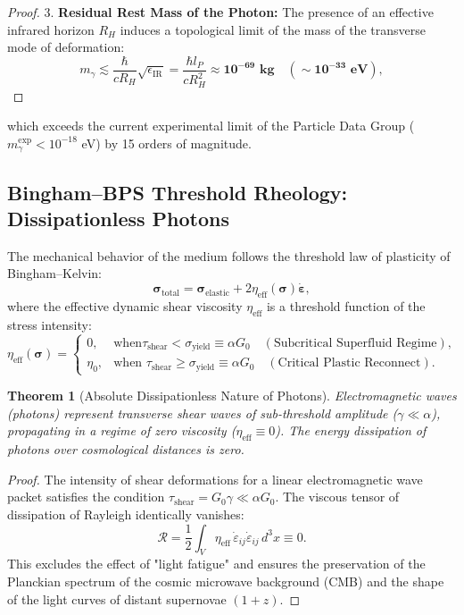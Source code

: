 \documentclass[12pt,a4paper]{article}
\newtheorem{theorem}{Theorem}
\begin{document}
\begin{proof}
	3. \textbf{Residual Rest Mass of the Photon:}
	The presence of an effective infrared horizon $R_H$ induces a topological limit of the mass of the transverse mode of deformation:
	\begin{equation}
	m_\gamma \lesssim \frac{\hbar}{c R_H} \sqrt{\epsilon_{\text{IR}}} = \frac{\hbar l_P}{c R_H^2} \approx \mathbf{10^{-69} \text{ kg}} \quad (\sim \mathbf{10^{-33} \text{ eV}}),
	\end{equation}
\end{proof}
	which exceeds the current experimental limit of the Particle Data Group ($m_\gamma^{\text{exp}} < 10^{-18}$ eV) by 15 orders of magnitude.
	
\subsection{Bingham--BPS Threshold Rheology: Dissipationless Photons}
	The mechanical behavior of the medium follows the threshold law of plasticity of Bingham--Kelvin:
\begin{equation}
\boldsymbol{\sigma}_{\text{total}} = \boldsymbol{\sigma}_{\text{elastic}} + 2 \eta_{\text{eff}}(\boldsymbol{\sigma}) \dot{\boldsymbol{\varepsilon}},
\end{equation}
where the effective dynamic shear viscosity $\eta_{\text{eff}}$ is a threshold function of the stress intensity:
\begin{equation}
\eta_{\text{eff}}(\boldsymbol{\sigma}) = \begin{cases} 
0, & \text{when} \tau_{\text{shear}} < \sigma_{\text{yield}} \equiv \alpha G_0 \quad (\text{Subcritical Superfluid Regime}), \\
\eta_0, & \text{when } \tau_{\text{shear}} \ge \sigma_{\text{yield}} \equiv \alpha G_0 \quad (\text{Critical Plastic Reconnect}).
\end{cases}
\end{equation}
													
\begin{theorem}[Absolute Dissipationless Nature of Photons]
Electromagnetic waves (photons) represent transverse shear waves of sub-threshold amplitude ($\gamma \ll \alpha$), propagating in a regime of zero viscosity ($\eta_{\mathrm{eff}} \equiv 0$). The energy dissipation of photons over cosmological distances is zero.
\end{theorem}
													
\begin{proof}
The intensity of shear deformations for a linear electromagnetic wave packet satisfies the condition $\tau_{\text{shear}} = G_0 \gamma \ll \alpha G_0$. The viscous tensor of dissipation of Rayleigh identically vanishes:
\begin{equation}
\mathcal{R} = \frac{1}{2} \int_V \eta_{\text{eff}} \, \dot{\varepsilon}_{ij} \dot{\varepsilon}_{ij} \, d^3x \equiv 0.
\end{equation}
This excludes the effect of "light fatigue" and ensures the preservation of the Planckian spectrum of the cosmic microwave background (CMB) and the shape of the light curves of distant supernovae $(1+z)$.
\end{proof}
													
\end{document}

